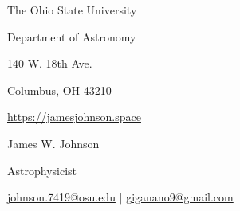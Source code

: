 \documentclass[cv.tex]{subfiles}
\begin{document}
\begin{center}
\parbox{.3\textwidth}{%
	\raggedleft
	The Ohio State University \par
	Department of Astronomy \par
	140 W. 18th Ave. \par
	Columbus, OH 43210 \par
	\url{https://jamesjohnson.space}
}
\hspace{1mm}
\vrule height 1.5cm width 0.4pt
\hspace{1mm}
\parbox{0.5\textwidth}{%
	{%
	\fontsize{30}{36} \selectfont James W. Johnson \par
	\fontsize{18}{25} \selectfont Astrophysicist \par
	\fontsize{11}{13} \selectfont
	\vspace{0.08cm}
	\href{mailto:johnson.7419@osu.edu}{johnson.7419@osu.edu} $\vert$
	\href{mailto:giganano9@gmail.com}{giganano9@gmail.com}
	}
}
\end{center}
\end{document}
